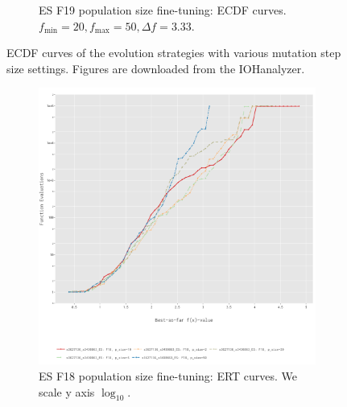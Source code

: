 \documentclass{article}
\begin{document}
\begin{figure}[!ht]
\begin{subfigure}[h]{0.95\linewidth}
        \caption{ES F19 population size fine-tuning: ECDF curves. $f_{\min} = 20, f_{\max} = 50, \Delta f = 3.33$.}
    \end{subfigure}
    \caption{ECDF curves of the evolution strategies with various mutation step size settings. Figures are downloaded from the IOHanalyzer.}
    \label{fig:experi-es-psize-ecdf}
\end{figure}

\begin{figure}[!ht]
    \begin{subfigure}[h]{0.95\linewidth}
        \includegraphics[width=\linewidth]{es/f18/ERT18ps.png}
        \caption{ES F18 population size fine-tuning: ERT curves. We scale y axis $\log_{10}$.}
    \end{subfigure}
    \hfill
    \begin{subfigure}[h]{0.95\linewidth}

\end{subfigure}
\end{figure}
\end{document}
